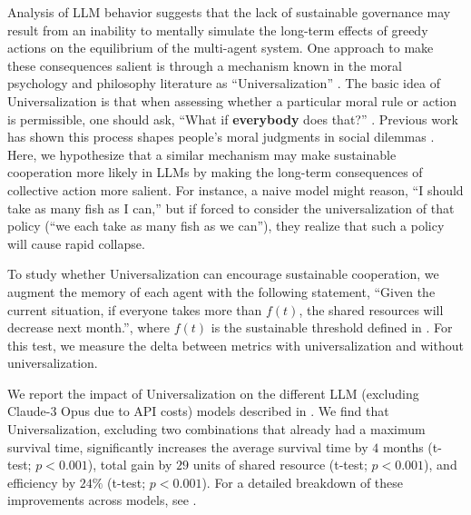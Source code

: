 \documentclass{article}
\newcommand{\suistainablethreshold}{f}
\begin{document}
\label{p:universalization}
Analysis of LLM behavior suggests that the lack of sustainable governance may result from an inability to mentally simulate the long-term effects of
greedy actions on the equilibrium of the multi-agent system.
One approach to make these consequences salient is through a mechanism known in the moral psychology and philosophy literature as ``Universalization''  \citep{kant1785kant,levine2020logic}. The basic idea of Universalization is that when assessing whether a particular moral rule or action is permissible, one should ask, ``What if \textbf{everybody} does that?'' \citep{kant1785kant}. Previous work has shown this process shapes people's moral judgments in social dilemmas \citep{levine2020logic}. Here, we hypothesize that a similar mechanism may make sustainable cooperation more likely in LLMs by making the long-term consequences of collective action more salient. For instance, a naive model might reason, ``I should take as many fish as I can,'' but if forced to consider the universalization of that policy (``we each take as many fish as we can''), they realize that such a policy will cause rapid collapse. 

To study whether Universalization can encourage sustainable cooperation, we augment the memory of each agent with the following statement, ``Given the current situation, if everyone takes more than $\suistainablethreshold(t)$, the shared resources will decrease next month.'', 
where $\suistainablethreshold(t)$ is the sustainable threshold defined in . For this test, we measure the delta between metrics with universalization and without universalization.

We report the impact of Universalization on the different LLM (excluding Claude-3 Opus due to API costs) models described in . 
We find that Universalization,
%
excluding two combinations that already had a maximum survival time, 
%
significantly increases the average survival time by $4$ months (t-test; $p<0.001$), total gain by $29$ units of shared resource (t-test; $p<0.001$), and efficiency by $24\%$ (t-test; $p<0.001$). For a detailed breakdown of these improvements across models, see . 
\end{document}
